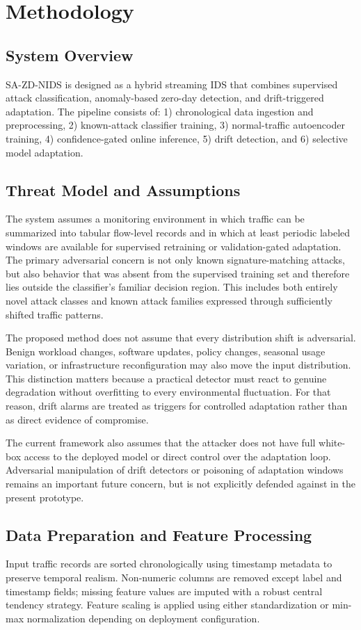 \documentclass[conference]{IEEEtran}
\begin{document}
\section{Methodology}
\subsection{System Overview}
SA-ZD-NIDS is designed as a hybrid streaming IDS that combines supervised attack classification, anomaly-based zero-day detection, and drift-triggered adaptation. The pipeline consists of: 1) chronological data ingestion and preprocessing, 2) known-attack classifier training, 3) normal-traffic autoencoder training, 4) confidence-gated online inference, 5) drift detection, and 6) selective model adaptation.

\subsection{Threat Model and Assumptions}
The system assumes a monitoring environment in which traffic can be summarized into tabular flow-level records and in which at least periodic labeled windows are available for supervised retraining or validation-gated adaptation. The primary adversarial concern is not only known signature-matching attacks, but also behavior that was absent from the supervised training set and therefore lies outside the classifier's familiar decision region. This includes both entirely novel attack classes and known attack families expressed through sufficiently shifted traffic patterns.

The proposed method does not assume that every distribution shift is adversarial. Benign workload changes, software updates, policy changes, seasonal usage variation, or infrastructure reconfiguration may also move the input distribution. This distinction matters because a practical detector must react to genuine degradation without overfitting to every environmental fluctuation. For that reason, drift alarms are treated as triggers for controlled adaptation rather than as direct evidence of compromise.

The current framework also assumes that the attacker does not have full white-box access to the deployed model or direct control over the adaptation loop. Adversarial manipulation of drift detectors or poisoning of adaptation windows remains an important future concern, but is not explicitly defended against in the present prototype.

\subsection{Data Preparation and Feature Processing}
Input traffic records are sorted chronologically using timestamp metadata to preserve temporal realism. Non-numeric columns are removed except label and timestamp fields; missing feature values are imputed with a robust central tendency strategy. Feature scaling is applied using either standardization or min-max normalization depending on deployment configuration.
\end{document}
